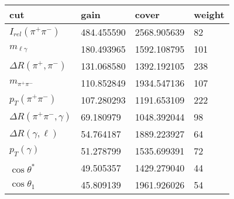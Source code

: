 \begin{tabular}{llll}
\toprule
cut &        gain &        cover &  weight \\
\midrule
$I_{rel}(\pi^{+}\pi^{-})$ & 484.455590 & 2568.905639 & 82 \\
$m_{\ell\gamma}$ & 180.493965 & 1592.108795 & 101 \\
$\Delta R(\pi^{+},\pi^{-})$ & 131.068580 & 1392.192105 & 238 \\
$m_{\pi^{+}\pi^{-}}$ & 110.852849 & 1934.547136 & 107 \\
$p_{T}(\pi^{+}\pi^{-})$ & 107.280293 & 1191.653109 & 222 \\
$\Delta R(\pi^{+}\pi^{-},\gamma)$ & 69.180979 &  1048.392044 & 98 \\
$\Delta R(\gamma,\ell)$ & 54.764187 & 1889.223927 & 64 \\
$p_{T}(\gamma)$ & 51.278799 & 1535.699391 & 72 \\
$\cos\theta^{*}$ & 49.505357 & 1429.279040 & 44 \\
$\cos\theta_{1}$ & 45.809139 & 1961.926026 & 54 \\
\bottomrule
\end{tabular}
